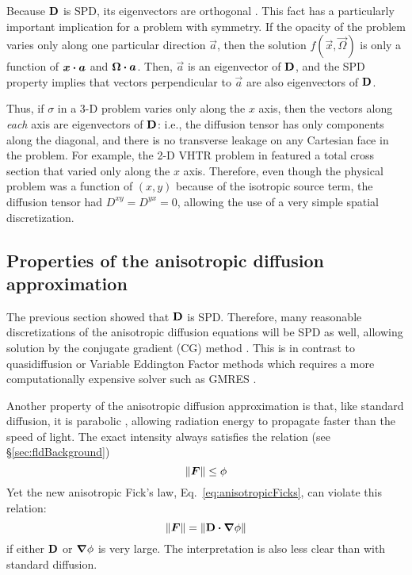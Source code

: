 Because $\mathbf{D}$ is SPD, its eigenvectors are orthogonal \cite[p.173]{Tre1997}.
This fact has a particularly important implication for a problem with symmetry.
If the opacity of the problem varies only along one particular direction
$\vec{a}$, then the
solution $f(\vec{x},\vec{\Omega})$ is only a function of $\bm{x}\bm{\cdot} \bm{a}$
and $\bm{\Omega} \bm{\cdot} \bm{a}$. Then, $\vec{a}$ is an eigenvector of $\mathbf{D}$,
and the SPD property implies that vectors perpendicular to $\vec{a}$ are also
eigenvectors of $\mathbf{D}$.

Thus, if $\sigma$ in a 3-D problem varies only along
the $x$ axis, then the vectors along \emph{each} axis are
eigenvectors of $\mathbf{D}$: i.e., the diffusion tensor has only
components along the diagonal, and there is no transverse leakage on any
Cartesian face in the problem. For example, the 2-D VHTR problem in
\cite{Lar2009c} featured a total cross section that varied only along the $x$
axis. Therefore, even though the physical problem was a function of $(x,y)$
because of the isotropic source term, the diffusion tensor had
$D^{xy}=D^{yx}=0$, allowing the use of a very simple spatial discretization.

\subsection{Properties of the anisotropic diffusion approximation}

The previous section showed that $\mathbf{D}$ is SPD. Therefore, many reasonable
discretizations of the anisotropic diffusion equations will be SPD as well,
allowing
solution by the conjugate gradient (CG) method \cite{Tre1997}. This is in
contrast to quasidiffusion or Variable Eddington Factor methods which requires a
more computationally expensive solver such as GMRES \cite{War2003}.

Another property of the anisotropic diffusion approximation is that, like
standard diffusion, it is parabolic \cite{Pom1982,Ols2000}, allowing
radiation energy to propagate faster than the speed of light. The exact
intensity always satisfies the relation (see \S\ref{sec:fldBackground})
\begin{equation*}
  \left\| \bm{F} \right\| \le \phi
\end{equation*}
Yet the new anisotropic Fick's law, Eq.~\eqref{eq:anisotropicFicks}, can violate
this relation:
\begin{equation*}
  \left\| \bm{F} \right\| = \left\| \mathbf{D} \bm{\cdot} \bm{\nabla} \phi \right\|
\end{equation*}
if either $\mathbf{D}$ or $\bm{\nabla} \phi$ is very large. The interpretation is also
less clear than with standard diffusion.

